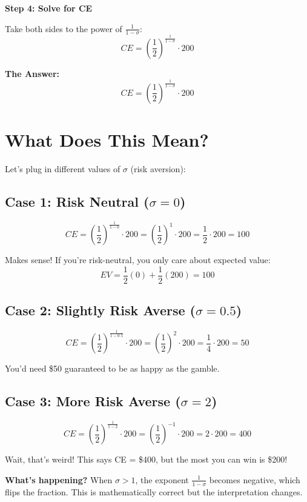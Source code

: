 \documentclass[12pt]{article}
\begin{document}
\textbf{Step 4: Solve for CE}

Take both sides to the power of $\frac{1}{1-\sigma}$:
\[
CE = \left(\frac{1}{2}\right)^{\frac{1}{1-\sigma}} \cdot 200
\]

\begin{tcolorbox}[colback=yellow!20!white,colframe=orange!75!black]
\textbf{The Answer:}
\[
\boxed{CE = \left(\frac{1}{2}\right)^{\frac{1}{1-\sigma}} \cdot 200}
\]
\end{tcolorbox}

\newpage

\section*{What Does This Mean?}

Let's plug in different values of $\sigma$ (risk aversion):

\subsection*{Case 1: Risk Neutral ($\sigma = 0$)}

\[
CE = \left(\frac{1}{2}\right)^{\frac{1}{1-0}} \cdot 200 = \left(\frac{1}{2}\right)^1 \cdot 200 = \frac{1}{2} \cdot 200 = 100
\]

Makes sense! If you're risk-neutral, you only care about expected value:
\[
EV = \frac{1}{2}(0) + \frac{1}{2}(200) = 100
\]

\subsection*{Case 2: Slightly Risk Averse ($\sigma = 0.5$)}

\[
CE = \left(\frac{1}{2}\right)^{\frac{1}{1-0.5}} \cdot 200 = \left(\frac{1}{2}\right)^2 \cdot 200 = \frac{1}{4} \cdot 200 = 50
\]

You'd need \$50 guaranteed to be as happy as the gamble.

\subsection*{Case 3: More Risk Averse ($\sigma = 2$)}

\[
CE = \left(\frac{1}{2}\right)^{\frac{1}{1-2}} \cdot 200 = \left(\frac{1}{2}\right)^{-1} \cdot 200 = 2 \cdot 200 = 400
\]

Wait, that's weird! This says CE = \$400, but the most you can win is \$200!

\textbf{What's happening?} When $\sigma > 1$, the exponent $\frac{1}{1-\sigma}$ becomes negative, which flips the fraction. This is mathematically correct but the interpretation changes.
\end{document}
